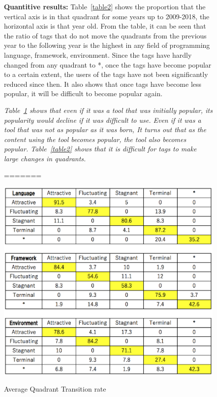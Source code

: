 \documentclass[conference]{IEEEtran}
\begin{document}
\begin{figure}[t]
\begin{oframed}
\textbf{Quantitive results:}
Table~\ref{table2} shows the proportion that the vertical axis is in that quadrant for some years up to 2009-2018, the horizontal axis is that year old. From the table, it can be seen that the ratio of tags that do not move the quadrants from the previous year to the following year is the highest in any field of programming language, framework, environment. Since the tags have hardly changed from any quadrant to *, once the tags have become popular to a certain extent, the users of the tags have not been significantly reduced since then. It also shows that once tags have become less popular, it will be difficult to become popular again.
\smallskip

\begin{oframed}
\emph{Table~\ref{table1} shows that even if it was a tool that was initially popular, its popularity would decline if it was difficult to use. Even if it was a tool that was not as popular as it was born, It turns out that as the content using the tool becomes popular, the tool also becomes popular. Table~\ref{table2} shows that it is difficult for tags to make large changes in quadrants.}

=======


\begin{table}[h]
 \centering
 \caption{Average Quadrant Transition rate}
 \includegraphics[width=.9\hsize]{img/LanguageAFST.eps} 
 \label{table1} 
\end{table}


\end{oframed}
\end{oframed}
\end{figure}
\end{document}
